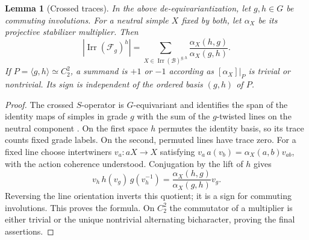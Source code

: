 \documentclass[11pt]{amsart}
\numberwithin{equation}{section}
\newtheorem{lemma}[theorem]{Lemma}
\theoremstyle{definition}
\theoremstyle{plain}
\DeclareMathOperator{\Irr}{Irr}
\begin{document}
\begin{lemma}[Crossed traces]\label{ext:crossed-trace}
In the above de-equivariantization, let $g,h\in G$ be commuting
involutions. For a neutral simple $X$ fixed by both, let $\alpha_X$
be its projective stabilizer multiplier. Then
\begin{equation}\label{ext:crossed-trace-formula}
 |\Irr(\mathcal F_g)^h|
 =\sum_{X\in\Irr(\mathcal B)^{g,h}}
       \frac{\alpha_X(h,g)}{\alpha_X(g,h)}.
\end{equation}
If $P=\langle g,h\rangle\simeq C_2^2$, a summand is $+1$ or $-1$
according as $[\alpha_X]|_P$ is trivial or nontrivial. Its sign is
independent of the ordered basis $(g,h)$ of $P$.
\end{lemma}
\begin{proof}
The crossed $S$-operator is $G$-equivariant and identifies the
span of the identity maps of simples in grade $g$ with the sum of
the $g$-twisted lines on the neutral component
\cite[Theorem~6.3, \S9 and proof of Lemma~10.7]{Kirillov}.
On the first space $h$ permutes the identity basis, so its trace
counts fixed grade labels. On the second, permuted lines have trace
zero. For a fixed line choose intertwiners $v_a:aX\to X$ satisfying
$v_a\,a(v_b)=\alpha_X(a,b)v_{ab}$, with the action coherence
understood. Conjugation by the lift of $h$ gives
\[
 v_h\,h(v_g)\,g(v_h^{-1})
 =\frac{\alpha_X(h,g)}{\alpha_X(g,h)}v_g.
\]
Reversing the line orientation inverts this quotient; it is a sign
for commuting involutions. This proves the formula. On $C_2^2$ the
commutator of a multiplier is either trivial or the unique nontrivial
alternating bicharacter, proving the final assertions.
\end{proof}
\end{document}
